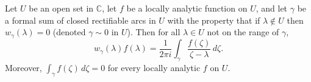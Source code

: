 Let $U$ be an open set in $\mathbb{C}$, let $f$ be a locally analytic function on $U$, and let $\gamma$ be a formal sum of closed rectifiable arcs in $U$ with the property that if $\lambda \notin U$ then $w_{\gamma}(\lambda) = 0$ (denoted $\gamma \sim 0$ in $U$). Then for all $\lambda \in U$ not on the range of $\gamma$,
$$w_{\gamma}(\lambda) f(\lambda) = \frac{1}{2\pi i} \int_{\gamma} \frac{f(\zeta)}{\zeta - \lambda} \, d\zeta.$$
Moreover, $\int_{\gamma} f(\zeta) \, d\zeta = 0$ for every locally analytic $f$ on $U$.
